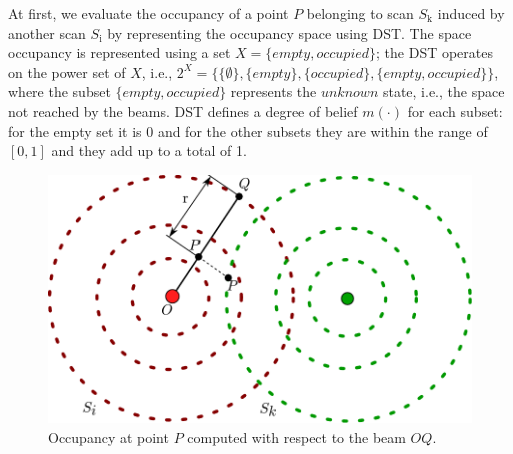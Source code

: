 At first, we evaluate the occupancy of a point $P$ belonging to scan $S_{\text{k}}$ induced by another scan $S_{\text{i}}$ by representing the occupancy space using DST.  The space occupancy is represented using a set $X = \{empty, occupied\}$; the DST operates on the power set of $X$, i.e., $2^X = \{\{\emptyset\}, \{empty\}, \{occupied\}, \{empty,occupied\}\}$, where the subset $\{empty,occupied\}$ represents the $unknown$ state, i.e., the space not reached by the beams. DST defines a degree of belief $m(\cdot)$ for each subset: for the empty set it is 0 and for the other subsets they are within the range of $[0, 1]$ and they add up to a total of 1.

\begin{figure}[t]
\centering
\includegraphics[width=0.7\columnwidth]{./img/ch-laser/scanoccupancy}
\caption{Occupancy at point $P$ computed with respect to the beam $OQ$.}
\label{fig:scanocc}
\end{figure}

